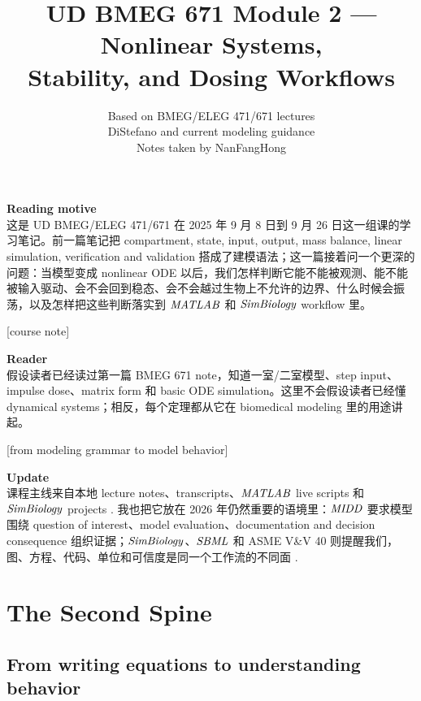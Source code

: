 \documentclass[a4paper]{article}
\title{UD BMEG 671 Module 2 --- Nonlinear Systems,\\ Stability, and Dosing Workflows}
\author{Based on BMEG/ELEG 471/671 lectures\\\small DiStefano and current modeling guidance\\\small Notes taken by NanFangHong}
\newcommand{\MIDD}{\ensuremath{\pksym{MIDD}}}
\newcommand{\SBML}{\ensuremath{\pksym{SBML}}}
\newcommand{\MATLAB}{\ensuremath{\pksym{MATLAB}}}
\newcommand{\SimBio}{\ensuremath{\pksym{SimBiology}}}
\begin{document}
\maketitle
{\small
  \noindent\textbf{Reading motive}\\
  这是 UD BMEG/ELEG 471/671 在 2025 年 9 月 8 日到 9 月 26 日这一组课的学习笔记。前一篇笔记把 compartment, state, input, output, mass balance, linear simulation, verification and validation 搭成了建模语法；这一篇接着问一个更深的问题：当模型变成 nonlinear ODE 以后，我们怎样判断它能不能被观测、能不能被输入驱动、会不会回到稳态、会不会越过生物上不允许的边界、什么时候会振荡，以及怎样把这些判断落实到 \MATLAB{} 和 \SimBio{} workflow 里。\par\hfill[course note]

  \vspace{5pt}
  \noindent\textbf{Reader}\\
  假设读者已经读过第一篇 BMEG 671 note，知道一室/二室模型、step input、impulse dose、matrix form 和 basic ODE simulation。这里不会假设读者已经懂 dynamical systems；相反，每个定理都从它在 biomedical modeling 里的用途讲起。\par\hfill[from modeling grammar to model behavior]

  \vspace{5pt}
  \noindent\textbf{Update}\\
  课程主线来自本地 lecture notes、transcripts、\MATLAB{} live scripts 和 \SimBio{} projects \cite{bmeg671Lectures3to10Slides2025,bmeg671TranscriptsSep08to262025,bmeg671MatlabNonlinearStability2025,bmeg671SimBiologyProjects2025}. 我也把它放在 2026 年仍然重要的语境里：\MIDD{} 要求模型围绕 question of interest、model evaluation、documentation and decision consequence 组织证据；\SimBio{}、\SBML{} 和 ASME V\&V 40 则提醒我们，图、方程、代码、单位和可信度是同一个工作流的不同面 \cite{ichM15Midd2026,fdaMiddProgram2026,mathworksSimBiologyTutorials2026,sbmlLevel3Version2Release2,asmeVV402018}.
}

\tableofcontents

\section{The Second Spine}

\subsection{From writing equations to understanding behavior}
\end{document}
